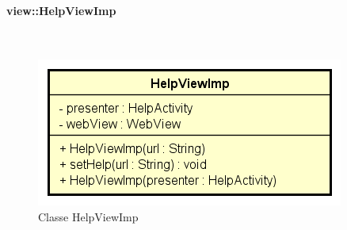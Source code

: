 \documentclass[../DefinizioneDiProdotto.tex]{subfiles}
\begin{document}
\paragraph{view::HelpViewImp}
\
\begin{figure}[H]
	\centering
	\includegraphics[width=\maxwidth]{img/HelpViewImp.png}
	\caption{Classe HelpViewImp}\label{fig:view::HelpViewImp} 
\end{figure}
\end{document}
